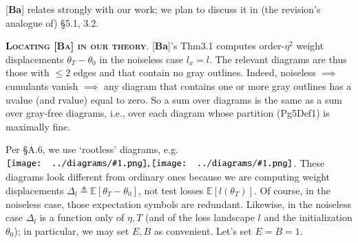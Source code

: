 \documentclass[12pt]{article}
\newcommand{\Rb}{\textmd{\textsf{\color{green!60}  {R2}}}}
\newcommand{\EE}{\mathbb{E}}
\newcommand{\dfn}[1]{\textmd{\textsf{Def#1}}}
\newcommand{\pag}[1]{\textmd{{\color{gray}Pg}{#1}}}
\newcommand{\thm}[1]{\textmd{{\color{gray}Thm}{#1}}}
\newcommand{\cit}[1]{[\textbf{#1}]}
\newcommand{\moosect}[1]{\par\noindent\hspace{-1cm}\textsc{\textbf{#1}}.}
\newcommand{\sizeddia}[2]{%
    \begin{gathered}%
        \texttt{[image: ../diagrams/\#1.png]}%
    \end{gathered}%
}
\newcommand{\mdia}[1]{\protect \sizeddia{#1}{0.14}}
\begin{document}

    \newcommand{\LaT}{\Lambda_{\text{\tiny\VarClock}}}
    \newcommand{\Lad}{\Lambda_{\text{\tiny\Thermo{4}}}}

    \noindent
    \cit{Ba}
    relates strongly with our work; we plan to discuss it in (the revision's
    analogue of) \S{5.1, 3.2}.

\moosect{Locating \cit{Ba} in our theory}
    \cit{Ba}'s \thm{3.1} computes order-$\eta^2$ weight
    displacements $\theta_T-\theta_0$ in the noiseless case $l_x=l$.  The
    relevant diagrams are thus those with $\leq 2$ edges and that contain no
    gray outlines.
    Indeed, noiseless $\implies$ cumulants vanish $\implies$ any diagram that
    contains one or more gray outlines has a uvalue (and rvalue) equal to
    zero.  So a sum over diagrams is the same as a sum over gray-free diagrams,
    i.e., over each diagram whose partition (\pag{5}\dfn{1}) is maximally fine.

    Per \S{A.6}, we use `rootless' diagrams, e.g.\
    $\mdia{MOOc(0-1)(01-1)}, \mdia{MOOc(0-1-2)(01-12-2)}$.  These diagrams look
    different from ordinary ones because we are computing weight displacements
    $\Delta_l \triangleq \EE[\theta_T-\theta_0]$, not test losses
    $\EE[l(\theta_T)]$.  Of course, in the noiseless case, those expectation
    symbols are redundant.  Likewise, in the noiseless case $\Delta_l$ is a
    function only of $\eta, T$ (and of the loss landscape $l$ and the
    initialization $\theta_0$); in particular, we may set $E,B$ as convenient.
    Let's set $E=B=1$.
\end{document}
